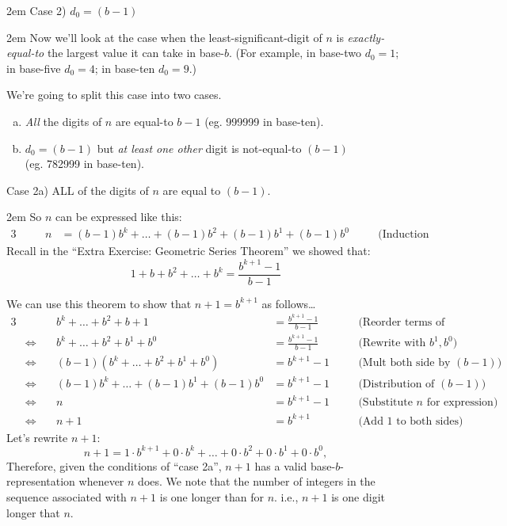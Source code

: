 \documentclass{article}
\newenvironment{jprIn}{\begin{adjustwidth}{2em}{}}{\end{adjustwidth}}
\begin{document}
\begin{jprIn}
\bigskip
Case 2) $d_0=(b-1)$
\begin{jprIn}
Now we'll look at the case when the least-significant-digit of $n$ is \emph{exactly-equal-to}
the largest value it can take in base-$b$.
(For example, in base-two
$d_0=1$; in base-five
$d_0=4$; in base-ten $d_0=9$.)

We're going to split this case into two cases.

\begin{enumerate}[a)]
\item \emph{All} the digits of $n$ are equal-to $b{-}1$ (eg. 999999 in base-ten).
\item $d_0=(b-1)$ but \emph{at least one other} digit is not-equal-to $(b-1)$\\
(eg. 782999 in base-ten).
\end{enumerate}
%

Case 2a) ALL of the digits of $n$ are equal to $(b-1)$.
\begin{jprIn}
So $n$ can be expressed like this:
\begin{alignat*}{3}
  &\quad&n
  &= (b{-}1)b^k+\dots{}+(b{-}1)b^2+(b{-}1)b^1+(b{-}1)b^0 &&\quad\text{(Induction Assumption)}
\end{alignat*}
Recall in the ``Extra Exercise: Geometric Series Theorem''
we showed that:
\[1+b+b^2+\dots{}+b^k=\frac{b^{k+1}-1}{b-1}\]

\break
We can use this theorem to show that $n+1=b^{k+1}$ as follows\dots
\smallskip
{\small
\begin{alignat*}{3}
  &&b^k+\dots{}+b^2+b+1
  &= \frac{b^{k+1}-1}{b-1} &&\quad\text{(Reorder terms of G.S.Thm.)}\\
  &\Leftrightarrow\quad
  &b^k+\dots{}+b^2+b^1+b^0
  &= \frac{b^{k+1}-1}{b-1} &&\quad\text{(Rewrite with }b^1, b^0\text{)}\\
  &\Leftrightarrow\quad
  &(b-1)(b^k+\dots{}+b^2+b^1+b^0)
  &= b^{k+1}-1 &&\quad\text{(Mult both side by }(b{-}1)\text{)}\\
  &\Leftrightarrow\quad
  &(b{-}1)b^k+\dots{}+(b{-}1)b^1+(b{-}1)b^0
  &= b^{k+1}-1 &&\quad\text{(Distribution of }(b{-}1)\text{)}\\
  &\Leftrightarrow\quad
  &n
  &= b^{k+1}-1 &&\quad\text{(Substitute }n\text{ for expression)}\\
  &\Leftrightarrow\quad
  &n+1
  &= b^{k+1} &&\quad\text{(Add 1 to both sides)}
\end{alignat*}
}Let's rewrite $n+1$:
\[n+1= 1\cdot{}b^{k+1}+0\cdot{}b^{k}+\dots{}+0\cdot{}b^2+0\cdot{}b^1+0\cdot{}b^0,\]
Therefore, given the conditions of ``case 2a'', $n+1$ has
a valid base-$b$-representation whenever $n$ does.
We note that
the number of integers in the sequence associated
with $n+1$ is one longer than for $n$. i.e., $n+1$ is one digit longer that $n$.


\end{jprIn}
\end{jprIn}
\end{jprIn}
\end{document}
